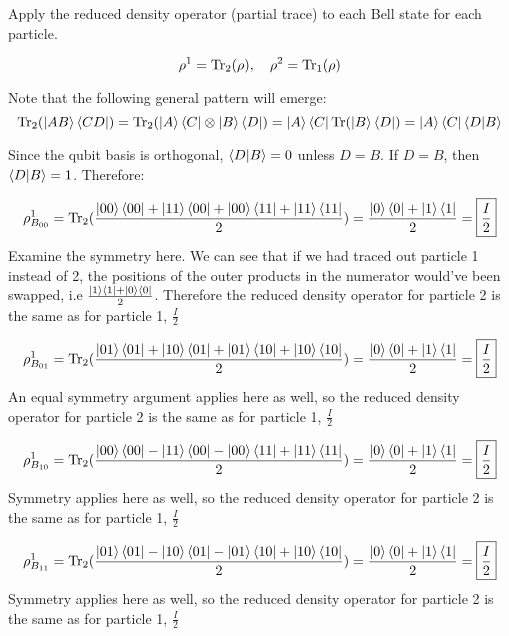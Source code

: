 \documentclass[11pt, a4paper]{article}
\begin{document}
Apply the reduced density operator (partial trace) to each Bell state for each 
particle.

\[\rho^1 = \Tr_2(\rho), \quad \rho^2 = \Tr_1(\rho)\]

Note that the following general pattern will emerge:
\[\Tr_2(\ket{AB}\bra{CD}) = \Tr_2(\ket{A}\bra{C}\otimes\ket{B}\bra{D}) = \ket{A}\bra{C}\Tr(\ket{B}\bra{D}) = \ket{A}\bra{C}\bra{D}\ket{B}\]

Since the qubit basis is orthogonal, $\bra{D}\ket{B} = 0$ unless $D = B$. If 
$D = B$, then $\bra{D}\ket{B} = 1$. Therefore:

\[\rho^1_{B_{00}} = \Tr_2(\frac{\ket{00}\bra{00} + \ket{11}\bra{00} + \ket{00}\bra{11} + \ket{11}\bra{11}}{2}) = \frac{\ket{0}\bra{0} + \ket{1}\bra{1}}{2} = \boxed{\frac{I}{2}}\]
Examine the symmetry here. We can see that if we had traced out particle 1
instead of 2, the positions of the outer products in the numerator would've been
swapped, i.e $\frac{\ket{1}\bra{1} + \ket{0}\bra{0}}{2}$. Therefore the reduced
density operator for particle 2 is the same as for particle 1, {$\boxed{\frac{I}{2}}$}

\[\rho^1_{B_{01}} = \Tr_2(\frac{\ket{01}\bra{01} + \ket{10}\bra{01} + \ket{01}\bra{10} + \ket{10}\bra{10}}{2}) = \frac{\ket{0}\bra{0} + \ket{1}\bra{1}}{2} = \boxed{\frac{I}{2}}\]
An equal symmetry argument applies here as well, so the reduced density operator
for particle 2 is the same as for particle 1, {$\boxed{\frac{I}{2}}$}

\[\rho^1_{B_{10}} = \Tr_2(\frac{\ket{00}\bra{00} - \ket{11}\bra{00} - \ket{00}\bra{11} + \ket{11}\bra{11}}{2}) = \frac{\ket{0}\bra{0} + \ket{1}\bra{1}}{2} = \boxed{\frac{I}{2}}\]
Symmetry applies here as well, so the reduced density operator for particle 2 is
the same as for particle 1, {$\boxed{\frac{I}{2}}$}

\[\rho^1_{B_{11}} = \Tr_2(\frac{\ket{01}\bra{01} - \ket{10}\bra{01} - \ket{01}\bra{10} + \ket{10}\bra{10}}{2}) = \frac{\ket{0}\bra{0} + \ket{1}\bra{1}}{2} = \boxed{\frac{I}{2}}\]
Symmetry applies here as well, so the reduced density operator for particle 2 is
the same as for particle 1, {$\boxed{\frac{I}{2}}$}
\end{document}
